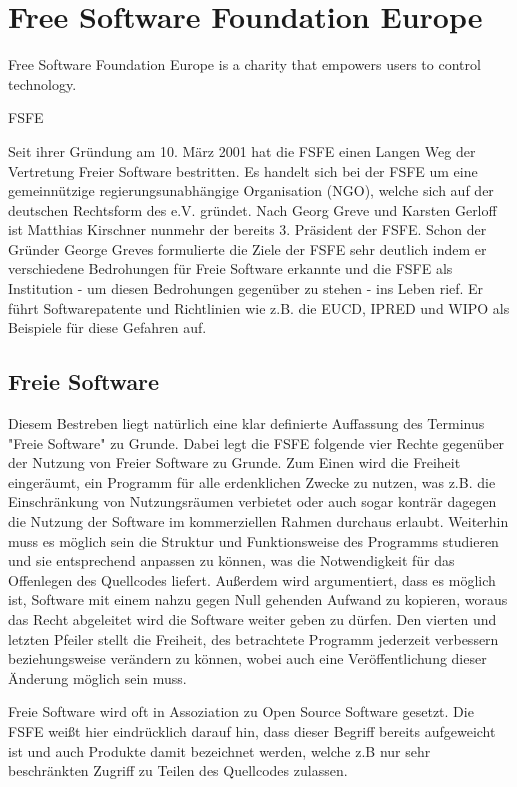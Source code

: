 \section{Free Software Foundation Europe}
\epigraph{Free Software Foundation Europe is a charity that empowers
users to control technology.}{FSFE}
Seit ihrer Gründung am 10. März 2001 hat die FSFE einen Langen Weg der 
Vertretung Freier Software bestritten. Es handelt sich bei der FSFE 
um eine gemeinnützige regierungsunabhängige Organisation (NGO), welche sich
auf der deutschen Rechtsform des e.V. gründet. Nach Georg 
Greve und Karsten Gerloff ist Matthias Kirschner nunmehr der bereits 3. 
Präsident der FSFE. Schon der Gründer George Greves formulierte die Ziele der 
FSFE sehr deutlich indem er verschiedene Bedrohungen für Freie Software 
erkannte und die FSFE als Institution - um diesen Bedrohungen gegenüber zu 
stehen - ins Leben rief.\cite{PLGreveInterView} Er führt Softwarepatente und Richtlinien wie z.B. die EUCD, IPRED und 
WIPO als Beispiele für diese Gefahren auf.

\subsection{Freie Software}
Diesem Bestreben liegt natürlich eine klar definierte Auffassung des Terminus 
"Freie Software" zu Grunde. Dabei legt die FSFE folgende vier
Rechte gegenüber der Nutzung von Freier Software zu Grunde. Zum Einen
wird die Freiheit eingeräumt, ein Programm für alle erdenklichen Zwecke zu 
nutzen, was z.B. die Einschränkung von Nutzungsräumen verbietet oder
auch sogar konträr dagegen die Nutzung der Software im kommerziellen Rahmen 
durchaus
erlaubt. Weiterhin muss es möglich sein die Struktur und Funktionsweise des 
Programms studieren und sie entsprechend
anpassen zu können, was die Notwendigkeit für das Offenlegen des Quellcodes 
liefert. Außerdem wird argumentiert, dass es möglich ist, Software mit einem 
nahzu gegen Null gehenden Aufwand zu kopieren, woraus das Recht abgeleitet wird
die Software weiter geben zu dürfen. Den
vierten und letzten Pfeiler stellt die Freiheit, des betrachtete Programm
jederzeit verbessern beziehungsweise verändern zu können, wobei auch eine 
Veröffentlichung dieser Änderung möglich sein muss.\cite{FsfeFs}

Freie Software wird oft in Assoziation zu Open Source Software gesetzt. Die
FSFE weißt hier eindrücklich darauf hin, dass dieser Begriff bereits aufgeweicht
ist und auch Produkte damit bezeichnet werden, welche z.B nur sehr beschränkten
Zugriff zu Teilen des Quellcodes zulassen.

